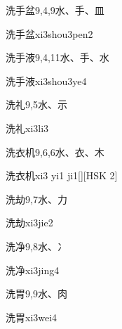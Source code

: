 \begin{entry}{洗手盆}{9,4,9}{⽔、⼿、⽫}
  \begin{phonetics}{洗手盆}{xi3shou3pen2}
  \end{phonetics}
\end{entry}

\begin{entry}{洗手液}{9,4,11}{⽔、⼿、⽔}
  \begin{phonetics}{洗手液}{xi3shou3ye4}
  \end{phonetics}
\end{entry}

\begin{entry}{洗礼}{9,5}{⽔、⽰}
  \begin{phonetics}{洗礼}{xi3li3}
  \end{phonetics}
\end{entry}

\begin{entry}{洗衣机}{9,6,6}{⽔、⾐、⽊}
  \begin{phonetics}{洗衣机}{xi3 yi1 ji1}[][HSK 2]
  \end{phonetics}
\end{entry}

\begin{entry}{洗劫}{9,7}{⽔、⼒}
  \begin{phonetics}{洗劫}{xi3jie2}
  \end{phonetics}
\end{entry}

\begin{entry}{洗净}{9,8}{⽔、⼎}
  \begin{phonetics}{洗净}{xi3jing4}
  \end{phonetics}
\end{entry}

\begin{entry}{洗胃}{9,9}{⽔、⾁}
  \begin{phonetics}{洗胃}{xi3wei4}
  \end{phonetics}
\end{entry}

